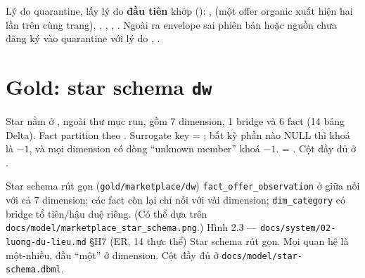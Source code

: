 Lý do quarantine, lấy lý do \textbf{đầu tiên} khớp (): ,
 (một offer organic xuất hiện hai lần trên cùng trang), ,
, , . Ngoài ra envelope sai phiên bản hoặc nguồn chưa
đăng ký vào quarantine với lý do , .

\section{Gold: star schema \texttt{dw}}\label{sec:star}
Star nằm ở , ngoài thư mục run, gồm 7 dimension, 1 bridge và 6 fact (14 bảng Delta).
Fact partition theo . Surrogate key = ; bất kỳ phần nào NULL thì khoá là $-1$,
và mọi dimension có dòng ``unknown member'' khoá $-1$.  = . Cột đầy đủ ở .

  {Star schema rút gọn (\texttt{gold/marketplace/dw})}
  {\texttt{fact\_offer\_observation} ở giữa nối với cả 7 dimension; các fact còn lại chỉ nối với vài dimension; \texttt{dim\_category} có bridge tổ tiên/hậu duệ riêng. (Có thể dựa trên \texttt{docs/model/marketplace\_star\_schema.png}.)}
  {Hình 2.3 — \texttt{docs/system/02-luong-du-lieu.md} §H7 (ER, 14 thực thể)}
  {Star schema rút gọn. Mọi quan hệ là một-nhiều, đầu ``một'' ở dimension. Cột đầy đủ ở \texttt{docs/model/star-schema.dbml}.}

